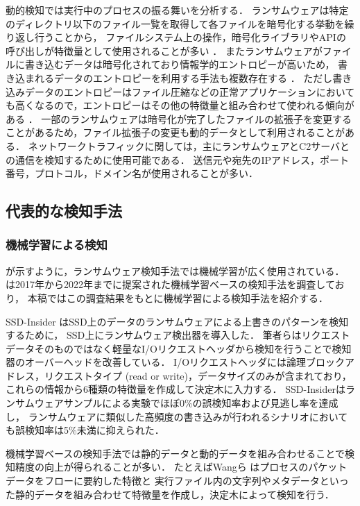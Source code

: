 動的検知では実行中のプロセスの振る舞いを分析する．
ランサムウェアは特定のディレクトリ以下のファイル一覧を取得して各ファイルを暗号化する挙動を繰り返し行うことから，
ファイルシステム上の操作，暗号化ライブラリやAPIの呼び出しが特徴量として使用されることが多い \cite{Evolution-Ransomware}．
またランサムウェアがファイルに書き込むデータは暗号化されており情報学的エントロピーが高いため，
書き込まれるデータのエントロピーを利用する手法も複数存在する \cite{kharaz2016unveil,kharraz2017redemption}．
ただし書き込みデータのエントロピーはファイル圧縮などの正常アプリケーションにおいても高くなるので，エントロピーはその他の特徴量と組み合わせて使われる傾向がある \cite{berrueta2019survey}．
一部のランサムウェアは暗号化が完了したファイルの拡張子を変更することがあるため，ファイル拡張子の変更も動的データとして利用されることがある\cite{medhat2018new}．
ネットワークトラフィックに関しては，主にランサムウェアとC2サーバとの通信を検知するために使用可能である．
送信元や宛先のIPアドレス，ポート番号，プロトコル，ドメイン名が使用されることが多い\cite{Evolution-Ransomware}．

\subsection{代表的な検知手法}
\subsubsection{機械学習による検知}
が示すように，ランサムウェア検知手法では機械学習が広く使用されている．
\cite{alraizza2023ransomware}は2017年から2022年までに提案された機械学習ベースの検知手法を調査しており，
本稿ではこの調査結果をもとに機械学習による検知手法を紹介する．

SSD-Insider \cite{baek2018ssd} はSSD上のデータのランサムウェアによる上書きのパターンを検知するために，
SSD上にランサムウェア検出器を導入した．
筆者らはリクエストデータそのものではなく軽量なI/Oリクエストヘッダから検知を行うことで検知器のオーバーヘッドを改善している．
I/Oリクエストヘッダには論理ブロックアドレス，リクエストタイプ (read or write)，データサイズのみが含まれており，
これらの情報から6種類の特徴量を作成して決定木に入力する．
SSD-Insiderはランサムウェアサンプルによる実験でほぼ0\%の誤検知率および見逃し率を達成し，
ランサムウェアに類似した高頻度の書き込みが行われるシナリオにおいても誤検知率は5\%未満に抑えられた．

機械学習ベースの検知手法では静的データと動的データを組み合わせることで検知精度の向上が得られることが多い\cite{alraizza2023ransomware}．
たとえばWangら \cite{wan2018feature}はプロセスのパケットデータをフローに要約した特徴と
実行ファイル内の文字列やメタデータといった静的データを組み合わせて特徴量を作成し，決定木によって検知を行う．

